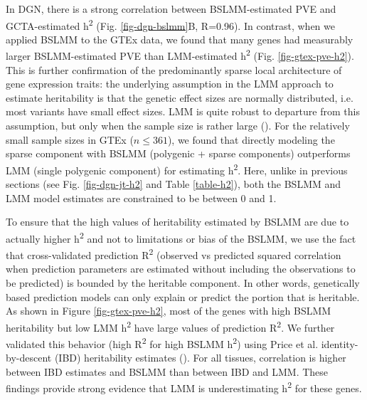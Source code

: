 \documentclass[10pt,letterpaper]{article}
\begin{document}
In DGN, there is a strong correlation between BSLMM-estimated PVE and GCTA-estimated h\textsuperscript{2} (Fig. \ref{fig-dgn-bslmm}B, R=0.96). In contrast, when we applied BSLMM to the GTEx data, we found that many genes had measurably larger BSLMM-estimated PVE than LMM-estimated h\textsuperscript{2} (Fig. \ref{fig-gtex-pve-h2}). This is further confirmation of the predominantly sparse local architecture of gene expression traits: the underlying assumption in the LMM approach to estimate heritability is that the genetic effect sizes are normally distributed, i.e. most variants have small effect sizes. LMM is quite robust to departure from this assumption, but only when the sample size is rather large (). For the relatively small sample sizes in GTEx (\(n \leq 361\)), we found that directly modeling the sparse component with BSLMM (polygenic + sparse components) outperforms LMM (single polygenic component) for estimating h\textsuperscript{2}. Here, unlike in previous sections (see Fig. \ref{fig-dgn-jt-h2} and Table \ref{table-h2}), both the BSLMM and LMM model estimates are constrained to be between 0 and 1. 

To ensure that the high values of heritability estimated by BSLMM are due to actually higher h\textsuperscript{2} and not to limitations or bias of the BSLMM, we use the fact that cross-validated prediction R\textsuperscript{2} (observed vs predicted squared correlation when prediction parameters are estimated without including the observations to be predicted) is bounded by the heritable component. In other words, genetically based prediction models can only explain or predict the portion that is heritable. As shown in Figure \ref{fig-gtex-pve-h2}, most of the genes with high BSLMM heritability but low LMM h\textsuperscript{2} have large values of prediction R\textsuperscript{2}. 
We further validated this behavior (high R\textsuperscript{2} for high BSLMM h\textsuperscript{2}) using Price et al. \cite{Price_2011} identity-by-descent (IBD) heritability estimates (). For all tissues, correlation is higher between IBD estimates and BSLMM than between IBD and LMM. These findings provide strong evidence that LMM is underestimating h\textsuperscript{2} for these genes.

\end{document}
